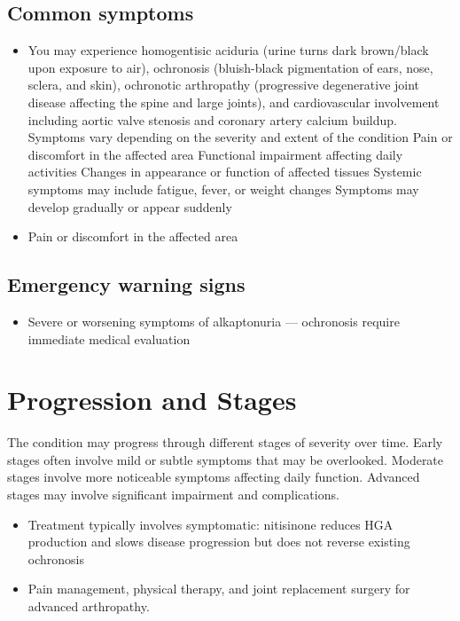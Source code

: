 \subsection{Common symptoms}
\begin{itemize}[noitemsep]
  \item You may experience homogentisic aciduria (urine turns dark brown/black upon exposure to air), ochronosis (bluish-black pigmentation of ears, nose, sclera, and skin), ochronotic arthropathy (progressive degenerative joint disease affecting the spine and large joints), and cardiovascular involvement including aortic valve stenosis and coronary artery calcium buildup. Symptoms vary depending on the severity and extent of the condition Pain or discomfort in the affected area Functional impairment affecting daily activities Changes in appearance or function of affected tissues Systemic symptoms may include fatigue, fever, or weight changes Symptoms may develop gradually or appear suddenly
  \item Pain or discomfort in the affected area
  \end{itemize}

\subsection{Emergency warning signs}
\begin{itemize}[noitemsep]
  \item Severe or worsening symptoms of alkaptonuria --- ochronosis require immediate medical evaluation
\end{itemize}
\section{Progression and Stages}
The condition may progress through different stages of severity over time. Early stages often involve mild or subtle symptoms that may be overlooked. Moderate stages involve more noticeable symptoms affecting daily function. Advanced stages may involve significant impairment and complications.

\begin{itemize}[noitemsep]
  \item Treatment typically involves symptomatic: nitisinone reduces HGA production and slows disease progression but does not reverse existing ochronosis
  \item Pain management, physical therapy, and joint replacement surgery for advanced arthropathy.
\end{itemize}
